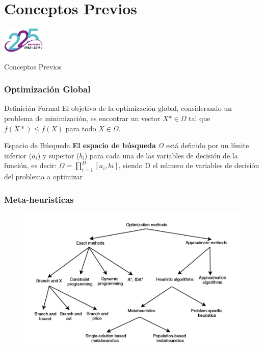 
\section{Conceptos Previos}

\begin{frame}
  \centering
  \includegraphics[width=0.15\textwidth]{img/ullesc.eps}
  \begin{scriptsize}
    \begin{center}
    \Huge{Conceptos Previos}
    \end{center}
  \end{scriptsize}
\end{frame}
\begin{frame}
    \frametitle{Optimización Global}
    \begin{block}{Definición Formal}
    El objetivo de la optimización global, considerando un problema de minimización, es encontrar un vector $X* \in \Omega$ tal que $f(X*) \leq f(X)$ para todo $X \in \Omega$.
    \end{block}
    \begin{block}{Espacio de Búsqueda}
    \textbf{El espacio de búsqueda} $\Omega$ está definido por un límite inferior ($a_{i}$) y superior ($b_{i}$) para cada una de las variables de decisión de la función, es decir: $\Omega = \prod^{D}_{i=1}[a_{i}, b{i}]$, siendo D el número de variables de decisión del problema a optimizar \citep{Segredo2017}
    \end{block}
\end{frame}

\begin{frame} %
\frametitle{Meta-heuristicas}
\begin{figure}
  \centering
	\includegraphics[scale=0.25]{img/meta}
\end{figure}
\end{frame}

